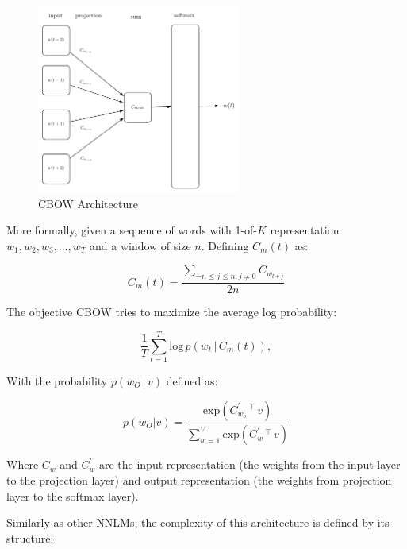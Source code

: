 \begin{figure}[hptb!]
    \centering
    \includegraphics[width=0.6\textwidth]{images/word2vec-cbow-latex.pdf} 
    \caption{CBOW Architecture}
    \label{fig:cbow-architecture-alone}
\end{figure}

More formally, given a sequence of words with 1-of-$K$ representation $w_1,w_2,w_3, \dots, w_T$ and a window
of size $n$. Defining $C_m(t)$ as:

\begin{equation}
\label{eq:cbow-mean}
   C_{m}(t) =    \frac{\sum_{-n \leq j \leq n, j \neq 0} { 
       C_{w_{t+j}}} } {2n}    
\end{equation}

The  objective  \ac{CBOW}  tries to maximize the average log probability:


\begin{equation}
  \label{eq:logprob-cbow}
   \frac{1}{T} \sum^{T}_{t=1} \text{log} \, p
     \left( w_t \, |\, C_{m}(t) \right),
\end{equation}



With the probability  $p\left( w_O \, |\, v \right)$  defined as:

\begin{equation}
  \label{eq:logp-cbow}
  p(w_O|v) = \frac{\text{exp}\left(C^{'}_{w_o}\,^\top\,v \right)
  }{\sum^{V}_{w=1} \text{exp} \left( C^{'}_w \,^\top\, v \right)   }  
\end{equation}


Where $C_w$ and $C^{'}_w$ are the input representation (the weights from the input layer to the
projection layer) and output representation (the weights from
projection layer to the softmax layer). 

Similarly as other \ac{NNLM}s, the complexity of this architecture
is defined by its structure:

